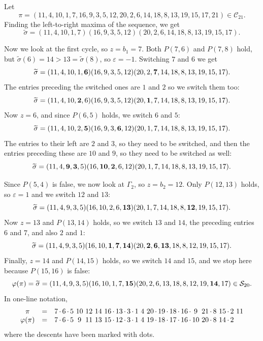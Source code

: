 \documentclass[11pt]{amsart}
\newcounter{Examplecount}
\newenvironment{example}[1][Example \arabic{Examplecount}.]{\vskip3pt \begin{trivlist}
\item[\hskip \labelsep {\bfseries #1}]}{\end{trivlist}\vskip2pt\stepcounter{Examplecount}}
\renewcommand\S{\mathcal S}
\newcommand\C{\mathcal C}
\newcommand\wt{\widetilde}
\newcommand\bij{\varphi}
\newcommand\eps{\varepsilon}
\newcommand\sigm{\wt\sigma}
\begin{document}
\begin{example}
Let $$\pi=(11,4,10,1,7,16,9,3,5,12,20,2,6,14,18,8,13,19,15,17,21)\in\C_{21}.$$
Finding the left-to-right maxima of the sequence, we get $$\sigm=(11,4,10,1,7)(16,9,3,5,12)(20,2,6,14,18,8,13,19,15,17).$$

Now we look at the first cycle, so $z=b_1=7$. Both $P(7,6)$ and $P(7,8)$ hold, but $\sigm(6)=14>13=\sigm(8)$, so $\eps=-1$.
Switching $7$ and $6$ we get $$\sigm=(11,4,10,1,{\bf 6})(16,9,3,5,12)(20,2,{\bf 7},14,18,8,13,19,15,17).$$
The entries preceding the switched ones are $1$ and $2$ so we switch them too: $$\sigm=(11,4,10,{\bf 2},6)(16,9,3,5,12)(20,{\bf 1},7,14,18,8,13,19,15,17).$$
Now $z=6$, and since $P(6,5)$ holds, we switch $6$ and $5$:
$$\sigm=(11,4,10,2,{\bf 5})(16,9,3,{\bf 6},12)(20,1,7,14,18,8,13,19,15,17).$$
The entries to their left are $2$ and $3$, so they need to be switched, and then the entries preceding these are $10$ and $9$, so they need to be switched as well:
$$\sigm=(11,4,{\bf 9},{\bf 3},5)(16,{\bf 10},{\bf 2},6,12)(20,1,7,14,18,8,13,19,15,17).$$

Since $P(5,4)$ is false, we now look at $\Gamma_2$, so $z=b_2=12$. Only $P(12,13)$ holds, so $\eps=1$ and we switch $12$ and $13$:
$$\sigm=(11,4,9,3,5)(16,10,2,6,{\bf 13})(20,1,7,14,18,8,{\bf 12},19,15,17).$$
Now $z=13$ and $P(13,14)$ holds, so we switch $13$ and $14$, the preceding entries $6$ and $7$, and also $2$ and $1$:
$$\sigm=(11,4,9,3,5)(16,10,{\bf 1},{\bf 7},{\bf 14})(20,{\bf 2},{\bf 6},{\bf 13},18,8,12,19,15,17).$$
Finally, $z=14$ and $P(14,15)$ holds, so we switch $14$ and $15$, and we stop here because $P(15,16)$ is false:
$$\bij(\pi)=\sigm=(11,4,9,3,5)(16,10,1,7,{\bf 15})(20,2,6,13,18,8,12,19,{\bf 14},17)\in\S_{20}.$$
In one-line notation,
\renewcommand{\tabcolsep}{0pt}
$$\begin{array}{cc*{2}{c@{\,\cdot\,}}*{4}{c@{\ }}*{3}{c@{\,\cdot\,}}*{2}{c@{\ }}*{4}{c@{\,\cdot\,}}c@{\ }c@{\,\cdot\,}c@{\ }c@{\,\cdot\,}c@{\ }c}
\pi&=&7&6&5&10&12&14&16&13&3&1&4&20&19&18&16&9&21&8&15&2&11\\
\bij(\pi)&=&7&6&5&9&11&13&15&12&3&1&4&19&18&17&16&10&20&8&14&2&
\end{array}$$
where the descents have been marked with dots.
\end{example}
\end{document}
